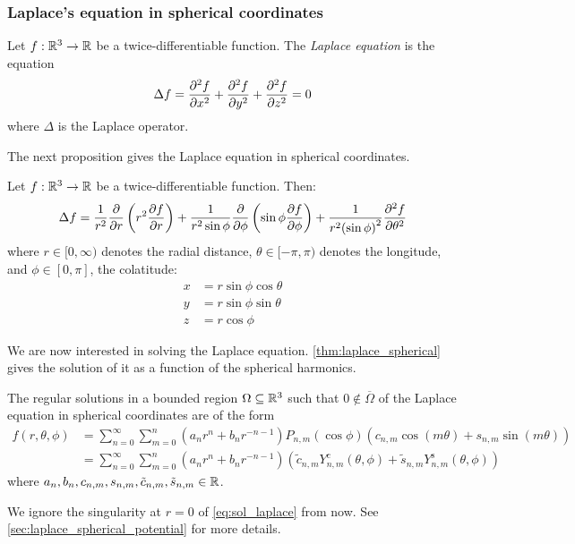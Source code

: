 \documentclass[../main.tex]{subfiles}
\begin{document}
\subsubsection{Laplace's equation in spherical coordinates}\label{sec:laplace_spherical}
\begin{definition}
  Let $f:\mathbb{R}^3\rightarrow\mathbb{R}$ be a twice-differentiable function. The \emph{Laplace equation} is the equation
  \begin{equation}
    \Delta f=\pdv[2]{f}{x}+\pdv[2]{f}{y}+\pdv[2]{f}{z}=0
  \end{equation}
  where $\Delta$ is the Laplace operator.
\end{definition}
The next proposition gives the Laplace equation in spherical coordinates.
\begin{proposition}
  Let $f:\mathbb{R}^3\rightarrow\mathbb{R}$ be a twice-differentiable function. Then:
  \begin{equation}\label{eq:laplace}
    \Delta f = \frac{1}{r^2}\pdv{}{r}\left(r^2\pdv{f}{r}\right)+\frac{1}{r^2\sin\phi}\pdv{}{\phi}\left(\sin\phi\pdv{f}{\phi}\right)+\frac{1}{r^2{(\sin\phi)}^2}\pdv[2]{f}{\theta}
  \end{equation}
  where $r\in[0,\infty)$ denotes the radial distance, $\theta\in[-\pi,\pi)$ denotes the longitude, and $\phi\in[0,\pi]$, the colatitude:
  \begin{equation}
    \begin{aligned}
      x & =r\sin\phi\cos\theta \\
      y & =r\sin\phi\sin\theta \\
      z & =r\cos\phi
    \end{aligned}
  \end{equation}
\end{proposition}
We are now interested in solving the Laplace equation. \cref{thm:laplace_spherical} gives the solution of it as a function of the spherical harmonics.
\begin{theorem}\label{thm:laplace_spherical}
  The regular solutions in a bounded region $\Omega\subseteq \mathbb{R}^3$ such that $0\notin\overline{\Omega}$ of the Laplace equation in spherical coordinates are of the form
  \begin{align}
    f(r,\theta,\phi) & = \sum_{n=0}^\infty \sum_{m=0}^n (a_n r^{n} +b_{n}r^{-n-1})P_{n,m}(\cos\phi) (c_{n,m}\cos(m\theta)+s_{n,m}\sin(m\theta))                                                              \\
                     & \label{eq:sol_laplace} = \sum_{n=0}^\infty \sum_{m=0}^n (a_n r^{n} +b_{n}r^{-n-1})(\tilde{c}_{n,m}Y_{n,m}^{\mathrm{c}}(\theta,\phi)+\tilde{s}_{n,m}Y_{n,m}^{\mathrm{s}}(\theta,\phi))
  \end{align}
  where $a_n,b_n,c_{n,m},s_{n,m},\tilde{c}_{n,m},\tilde{s}_{n,m}\in\mathbb{R}$.
\end{theorem}
We ignore the singularity at $r=0$ of \cref{eq:sol_laplace} from now. See \cref{sec:laplace_spherical_potential} for more details.
\end{document}
